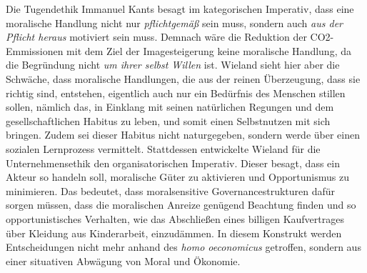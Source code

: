 \documentclass[12pt]{article}
\begin{document}
Die Tugendethik Immanuel Kants besagt im kategorischen Imperativ, dass eine moralische Handlung nicht nur \textit{pflichtgemäß} sein muss, sondern auch \textit{aus der Pflicht heraus} motiviert sein muss. Demnach wäre die Reduktion der CO2-Emmissionen mit dem Ziel der Imagesteigerung keine moralische Handlung, da die Begründung nicht \textit{um ihrer selbst Willen} ist. Wieland sieht hier aber die Schwäche, dass moralische Handlungen, die aus der reinen Überzeugung, dass sie richtig sind, entstehen, eigentlich auch nur ein Bedürfnis des Menschen stillen sollen, nämlich das, in Einklang mit seinen natürlichen Regungen und dem gesellschaftlichen Habitus zu leben, und somit einen Selbstnutzen mit sich bringen. Zudem sei dieser Habitus nicht naturgegeben, sondern werde über einen sozialen Lernprozess vermittelt. Stattdessen entwickelte Wieland für die Unternehmensethik den organisatorischen Imperativ. Dieser besagt, dass ein Akteur so handeln soll, moralische Güter zu aktivieren und Opportunismus zu minimieren. Das bedeutet, dass moralsensitive Governancestrukturen dafür sorgen müssen, dass die moralischen Anreize genügend Beachtung finden und so opportunistisches Verhalten, wie das Abschließen eines billigen Kaufvertrages über Kleidung aus Kinderarbeit, einzudämmen. In diesem Konstrukt werden Entscheidungen nicht mehr anhand des \textit{homo oeconomicus} getroffen, sondern aus einer situativen Abwägung von Moral und Ökonomie.
\clearpage
\frontmatter%
\renewcommand{\plaintitle}{Literaturverzeichnis}
\setcounter{page}{5}
\printMyBibliography
\end{document}
